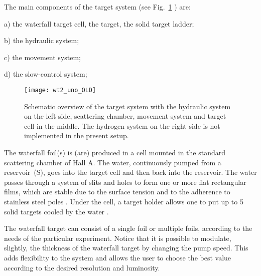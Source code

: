 The main components of the target system (see Fig.~\ref{fig:wt_uno}
) are: 
\begin{list}{}{\setlength{\itemsep}{-0.15cm}}
\item[a)] the waterfall target cell, the target, the solid target ladder; 
\item[b)] the hydraulic system; 
\item[c)] the movement system; 
\item[d)] the slow-control system; 
\end{list}

\begin{figure}[htp]
\begin{center}\texttt{[image: wt2\_uno\_OLD]}\end{center}
\caption[Waterfall target system]%
{Schematic overview of the target system with the hydraulic system
  on the left side, scattering chamber, movement system and target cell
  in the middle. The hydrogen system on the right side is not implemented
  in the present setup.}
\label{fig:wt_uno}
\end{figure}

%

The waterfall foil(s) is (are) produced in a cell mounted in the standard
scattering chamber 
of Hall A. 
The water, continuously pumped from a reservoir~(S), goes into
the target cell and then back into the reservoir. The water passes
through a system of slits and holes to form one or more flat rectangular
films, which are stable due to the surface tension and to the adherence
to stainless steel poles%
.%
Under the cell, a
target holder allows one to put up to 5 solid targets cooled by the
water%
.%

The waterfall target can consist of a single foil or multiple foils,
according to the needs of the particular experiment. Notice that it
is possible to modulate, slightly, the thickness of the waterfall
target by changing the pump speed. This adds flexibility to the system
and allows the user to choose the best value according to the desired
resolution and luminosity.

